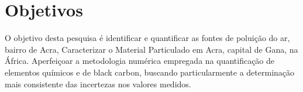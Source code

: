 \section{Objetivos}

O objetivo desta pesquisa é identificar e quantificar 
as fontes de poluição do ar, bairro de Acra,  
Caracterizar o Material Particulado em Acra, capital de Gana, na África.
Aperfeiçoar a metodologia numérica empregada na quantificação de elementos 
químicos e de black carbon, buscando particularmente a determinação mais
consistente das incertezas nos valores medidos.


